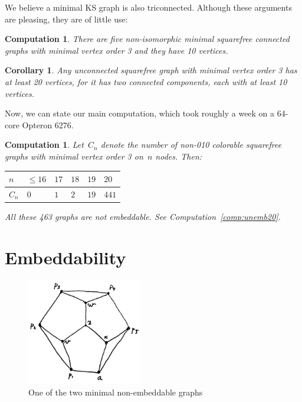 \documentclass[a4paper]{article}
\newcounter{main}
\newtheorem{comp}[main]{Computation}
\newtheorem{cor}[main]{Corollary}
\theoremstyle{definition}
\theoremstyle{remark}
\begin{document}
We believe a minimal KS graph is also triconnected.
Although these arguments are pleasing,
they are of little use:
\begin{comp}
    There are five non-isomorphic minimal
    squarefree connected graphs
    with minimal vertex order 3 and they have 10 vertices.
\end{comp}
\begin{cor}
    Any unconnected
    squarefree graph with minimal vertex order 3
    has at least 20 vertices, for it has two connected components,
    each with at least 10 vertices.
\end{cor}

Now, we can state our main computation, which took roughly a week
    on a 64-core Opteron 6276.
\begin{comp}
    Let~$C_n$ denote the number of non-010 colorable squarefree
    graphs with minimal vertex order 3 on~$n$ nodes.  Then:

    \begin{center}
    \begin{tabular}{l|lllll}
        $n$ & $\leq 16$
            & $17$
            & $18$
            & $19$
            & $20$ \\
        \hline
        $C_n$ & $0$
            & $1$
            & $2$
            & $19$
            & $441$
    \end{tabular}
    \end{center}

    All these 463 graphs are not embeddable.
    See Computation~\ref{comp:unemb20}.
\end{comp}


\section{Embeddability}
\label{sec:emb}
\begin{figure}
\begin{center}
\includegraphics[width=50mm]{graphs/unemb-10-2.jpg}
\end{center}
\caption{One of the two minimal
        non-embeddable graphs
\label{fig:unemb-10-2}}
\end{figure}
\end{document}
